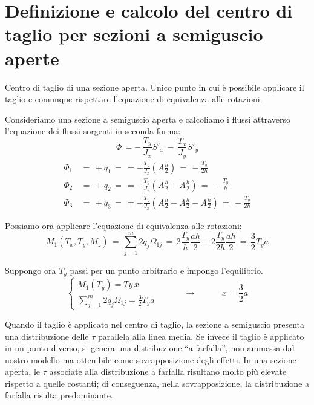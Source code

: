 \section{Definizione e calcolo del centro di taglio per sezioni a semiguscio aperte}

\begin{definizioneBox}
    Centro di taglio di una sezione aperta. Unico punto in cui è possibile applicare il taglio e comunque rispettare l'equazione di equivalenza alle rotazioni.
\end{definizioneBox}

Consideriamo una sezione a semiguscio aperta e calcoliamo i flussi attraverso l'equazione dei flussi sorgenti in seconda forma:
\begin{equation*}
       \Phi\, = -\, \frac{T_y}{J_x}S'_x  \,-\, \frac{T_x}{J_y}S'_y 
    \end{equation*}
    \begin{align*}
        \Phi_1 \,&=\, +q_1 \,= \, = -\frac{T_y}{J_x}\left( A\frac{h}{2} \right) \,=\, -\frac{T_y}{2h}\\
         \Phi_2 \,&=\, +q_2 \,= \, = -\frac{T_y}{J_x}\left( A\frac{h}{2}+A\frac{h}{2} \right) \,=\, -\frac{T_y}{h}\\
          \Phi_3 \,&=\, +q_3 \,= \, = -\frac{T_y}{J_x}\left( A\frac{h}{2}+A\frac{h}{2}-A\frac{h}{2} \right) \,=\, -\frac{T_y}{2h}
    \end{align*}


Possiamo ora applicare l'equazione di equivalenza alle rotazioni:
\begin{equation*}
    M_1 (T_x, T_y, M_z)\,=\, \sum^m_{j=1}2q_j\Omega_{1j} \,=\, 2\frac{T_y}{h} \frac{ah}{2} +2\frac{T_y}{2h} \frac{ah}{2} \,=\, \frac{3}{2}T_ya
\end{equation*}

Suppongo ora $T_y$ passi per un punto arbitrario e impongo l'equilibrio.
\begin{equation*}
\begin{cases}
     M_1(T_y)=Ty\,x\\
    \sum^m_{j=1}2q_j\Omega_{1j} = \frac{3}{2}T_ya
\end{cases}
\quad\quad\quad\rightarrow\quad\quad\quad
   x=\frac{3}{2}a
\end{equation*}



Quando il taglio è applicato nel centro di taglio, la sezione a semiguscio presenta una distribuzione delle $\tau$ parallela alla linea media. Se invece il taglio è applicato in un punto diverso, si genera una distribuzione “a farfalla”, non ammessa dal nostro modello ma ottenibile come sovrapposizione degli effetti. In una sezione aperta, le $\tau$ associate alla distribuzione a farfalla risultano molto più elevate rispetto a quelle costanti; di conseguenza, nella sovrapposizione, la distribuzione a farfalla risulta predominante.









